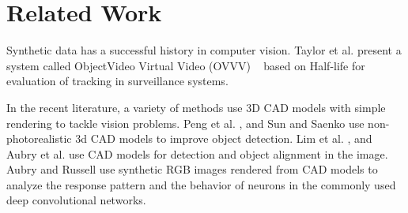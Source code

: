 \section{Related Work}
Synthetic data has a successful history in computer vision. Taylor et al.
present a system called ObjectVideo Virtual Video (OVVV) ~\cite{Taylor_2007} based on Half-life for evaluation of tracking in surveillance systems. 
 
In the recent literature, a variety of methods use 3D CAD models with simple rendering to tackle vision problems. Peng et al. , and Sun and Saenko use non-photorealistic 3d CAD models to improve object detection. Lim et al. , and Aubry et al. use CAD models for detection and object alignment in the image. Aubry and Russell use synthetic RGB images rendered from CAD models to analyze the response pattern and the behavior of neurons in the commonly used deep convolutional networks.